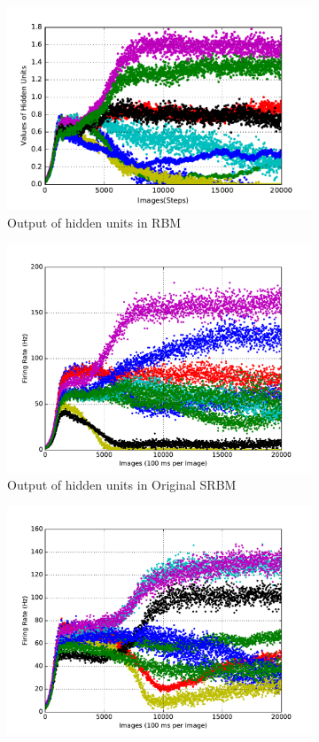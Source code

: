 \begin{figure}
\begin{subfigure}[t]{0.32\textwidth}
		\includegraphics[width=\textwidth]{pics_sdlm/31_exp_RBM_noise/exp3_hid_s_2.pdf}
		\caption{Output of hidden units in RBM}
	\end{subfigure}
	\begin{subfigure}[t]{0.32\textwidth}
		\includegraphics[width=\textwidth]{pics_sdlm/10_exp_SRBM_Orig/exp3_hid_s_2.pdf}
		\caption{Output of hidden units in Original SRBM}
	\end{subfigure}
	\begin{subfigure}[t]{0.32\textwidth}
		\includegraphics[width=\textwidth]{pics_sdlm/17_exp_SRBM_all_long/exp3_hid_s_2.pdf}

\end{subfigure}
\end{figure}
